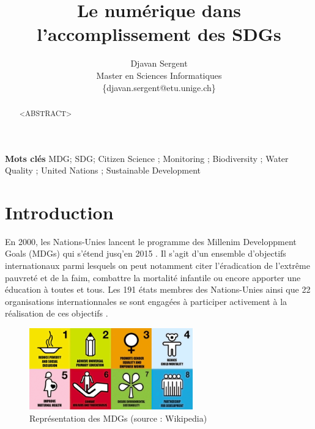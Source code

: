 \documentclass[10pt, conference, compsocconf]{llncs}
\begin{document}
%
\title{Le numérique dans\\l'accomplissement des SDGs}





% 
\author{Djavan Sergent \\
Master en Sciences Informatiques \\
 \{djavan.sergent@etu.unige.ch\}}




\maketitle


\begin{abstract}
	<ABSTRACT>
\end{abstract}


\textbf{Mots clés}
MDG; SDG; Citizen Science ; Monitoring ; Biodiversity ; Water Quality ; United Nations ; Sustainable Development


\section{Introduction}
	En 2000, les Nations-Unies lancent le programme des Millenim Developpment Goals (MDGs) qui s'étend jusq'en 2015 \cite{united_nations_millennium_2009}. Il s'agit d'un ensemble d'objectifs internationaux parmi lesquels on peut notamment citer l'éradication de l'extrême pauvreté et de la faim, combattre la mortalité infantile ou encore apporter une éducation à toutes et tous. Les 191 états membres des Nations-Unies ainsi que 22 organisations internationnales se sont engagées à participer activement à la réalisation de ces objectifs \cite{wikipedia_millennium_2017}.
	\begin{figure}
		\begin{center}
			\includegraphics[width=200pt]{mdgs-full.png}
		\end{center}
		\caption{Représentation des MDGs (source : Wikipedia)}
	\end{figure}
	
\end{document}
